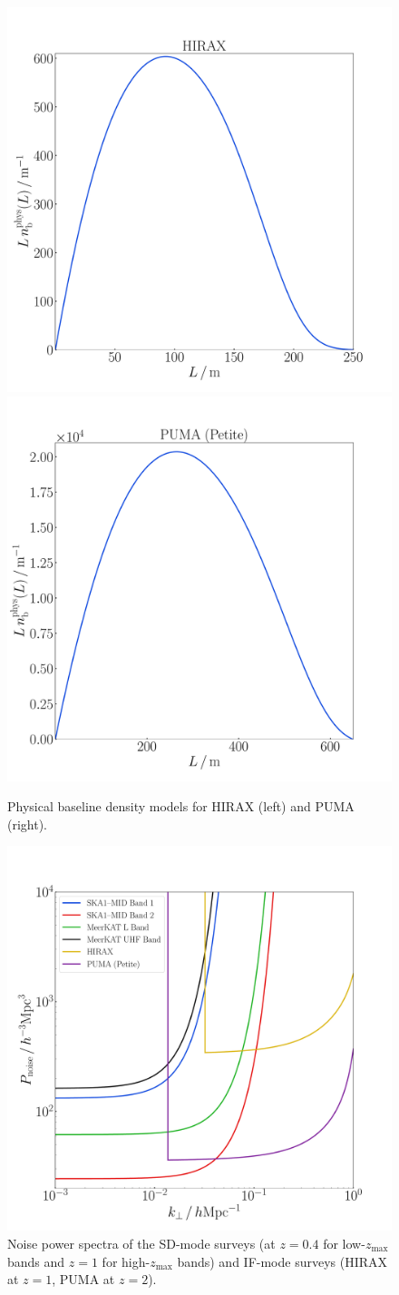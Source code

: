 \begin{figure}[!ht]
\centering
\includegraphics[width=.49\textwidth]{fig/nbHIRAX}
\includegraphics[width=.49\textwidth]{fig/nbPUMAPetite}
\vspace*{-0.5cm}
\caption{Physical baseline density models for HIRAX (left) and PUMA (right).}\label{nbphys}
\end{figure}
\begin{figure}[!ht]
\centering
\includegraphics[width=.8\textwidth]{fig/Pnoise}
\vspace*{-0.5cm}
\caption{Noise power spectra of the SD-mode surveys (at $z=0.4$ for low-$z_\mathrm{max}$ bands and $z=1$ for high-$z_\mathrm{max}$ bands) and IF-mode surveys (HIRAX at $z=1$, PUMA at $z=2$).}\label{pnoise}
\end{figure}


